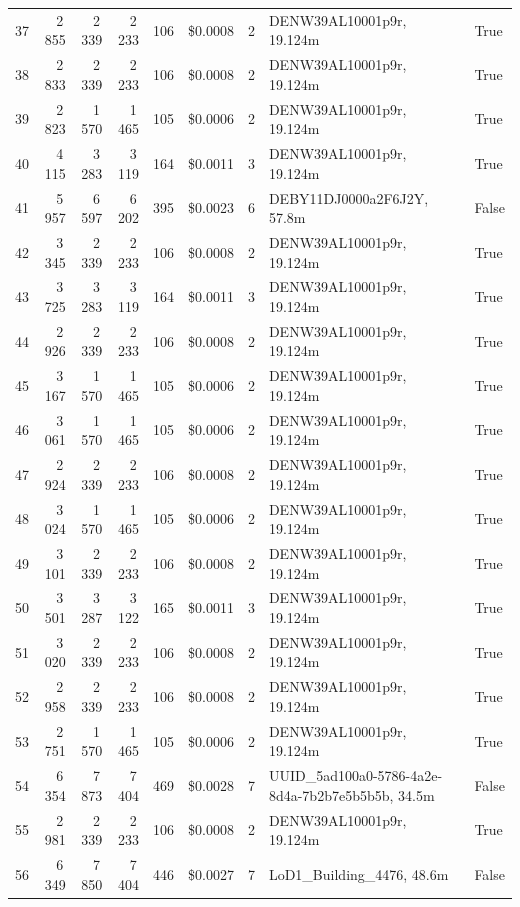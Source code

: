 \documentclass[a4paper,11pt]{article}
\begin{document}
\begin{table}[ht]
\begin{tabular}{r r r r r r r p{3cm} l}
37 & 2\,855 & 2\,339 & 2\,233 & 106 & \$0.0008 & 2 & DENW39AL10001p9r, 19.124m & True \\
38 & 2\,833 & 2\,339 & 2\,233 & 106 & \$0.0008 & 2 & DENW39AL10001p9r, 19.124m & True \\
39 & 2\,823 & 1\,570 & 1\,465 & 105 & \$0.0006 & 2 & DENW39AL10001p9r, 19.124m & True \\
40 & 4\,115 & 3\,283 & 3\,119 & 164 & \$0.0011 & 3 & DENW39AL10001p9r, 19.124m & True \\
41 & 5\,957 & 6\,597 & 6\,202 & 395 & \$0.0023 & 6 & DEBY11DJ0000a2F6J2Y, 57.8m & False \\
42 & 3\,345 & 2\,339 & 2\,233 & 106 & \$0.0008 & 2 & DENW39AL10001p9r, 19.124m & True \\
43 & 3\,725 & 3\,283 & 3\,119 & 164 & \$0.0011 & 3 & DENW39AL10001p9r, 19.124m & True \\
44 & 2\,926 & 2\,339 & 2\,233 & 106 & \$0.0008 & 2 & DENW39AL10001p9r, 19.124m & True \\
45 & 3\,167 & 1\,570 & 1\,465 & 105 & \$0.0006 & 2 & DENW39AL10001p9r, 19.124m & True \\
46 & 3\,061 & 1\,570 & 1\,465 & 105 & \$0.0006 & 2 & DENW39AL10001p9r, 19.124m & True \\
47 & 2\,924 & 2\,339 & 2\,233 & 106 & \$0.0008 & 2 & DENW39AL10001p9r, 19.124m & True \\
48 & 3\,024 & 1\,570 & 1\,465 & 105 & \$0.0006 & 2 & DENW39AL10001p9r, 19.124m & True \\
49 & 3\,101 & 2\,339 & 2\,233 & 106 & \$0.0008 & 2 & DENW39AL10001p9r, 19.124m & True \\
50 & 3\,501 & 3\,287 & 3\,122 & 165 & \$0.0011 & 3 & DENW39AL10001p9r, 19.124m & True \\
51 & 3\,020 & 2\,339 & 2\,233 & 106 & \$0.0008 & 2 & DENW39AL10001p9r, 19.124m & True \\
52 & 2\,958 & 2\,339 & 2\,233 & 106 & \$0.0008 & 2 & DENW39AL10001p9r, 19.124m & True \\
53 & 2\,751 & 1\,570 & 1\,465 & 105 & \$0.0006 & 2 & DENW39AL10001p9r, 19.124m & True \\
54 & 6\,354 & 7\,873 & 7\,404 & 469 & \$0.0028 & 7 & UUID\_5ad100a0-5786-4a2e-8d4a-7b2b7e5b5b5b, 34.5m & False \\
55 & 2\,981 & 2\,339 & 2\,233 & 106 & \$0.0008 & 2 & DENW39AL10001p9r, 19.124m & True \\
56 & 6\,349 & 7\,850 & 7\,404 & 446 & \$0.0027 & 7 & LoD1\_Building\_4476, 48.6m & False \\

\end{tabular}
\end{table}
\end{document}
